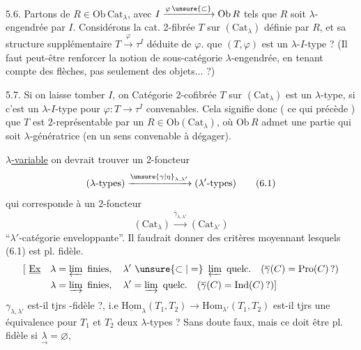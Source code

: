 5.6. Partons de $R\in\mathrm{Ob}\,\mathrm{Cat}_{\lambda}$, avec $I\xrightarrow{\varphi\,\unsure{\subset}} \mathrm{Ob}\,R$ tels
que $R$ soit $\lambda$-engendrée par $I$. Considérons la cat.
2-fibrée $T$ sur $(\mathrm{Cat}_{\lambda})$ définie par $R$, et sa structure
supplémentaire $T\xrightarrow{\varphi}\tau^I$ déduite de $\varphi$. 
que $(T,\varphi)$ est un $\lambda$-$I$-type ? (Il faut peut-être
\margin{$|\!|\!|$}renforcer la notion de sous-catégorie $\lambda$-engendrée, en
tenant compte des flèches, pas seulement des objets... ?)

5.7. Si on laisse tomber $I$, on 
Catégorie 2-cofibrée $T$ sur $(\mathrm{Cat}_{\lambda})$ est un $\lambda$-type, si c'est
un $\lambda$-$I$-type pour  $\varphi:T\longrightarrow\tau^I$ convenables. Cela
signifie donc ( ce qui précède ) que
$T$ est 2-représentable par un $R\in\mathrm{Ob}(\mathrm{Cat}_{\lambda})$, où
$\mathrm{Ob}\,R$ admet une  partie qui soit $\lambda$-génératrice
(en un sens convenable à dégager).


 \uline{$\lambda$-variable} on devrait trouver  un 2-foncteur
\[
(\lambda\text{-types})\xrightarrow{\unsure{\gamma|\eta}_{\lambda,\lambda'}}(\lambda'\text{-types})\tag*{(6.1)}
\]
qui corresponde à un 2-foncteur
\[
(\mathrm{Cat}_{\lambda})\xrightarrow{\overline\gamma_{\lambda,\lambda'}}(\mathrm{Cat}_{\lambda'})\tag*{(6.2)}
\]
``$\lambda'$-catégorie enveloppante''. Il faudrait donner des
critères moyennant lesquels (6.1) est pl. fidèle.
\[
\begin{aligned}
[\ \underline{\text{Ex}}\quad\lambda&=\varprojlim\text{ finies},\quad\lambda'\ \unsure{\subset|=}\ \varprojlim\text{ quelc.}\quad(\overline\gamma(C)=\mathrm{Pro}(C)\,?)\\
\lambda&=\varinjlim\text{ finies},\quad\lambda'=\varinjlim\text{ quelc.}\quad(\overline\gamma(C)=\mathrm{Ind}(C)\,?)]
\end{aligned}
\]
 $\gamma_{\lambda,\lambda'}$ est-il tjrs -fidèle ?, i.e
$\underline{\mathrm{Hom}}_\lambda(T_1,T_2)\longrightarrow\mathrm{Hom}_{\lambda'}(T_1,T_2)$
est-il tjrs une équivalence pour $T_1$ et $T_2$ deux $\lambda$-types ? Sans
doute faux, mais ce doit être pl. fidèle si $\underset{\rightarrow}{\lambda}=\varnothing$,

